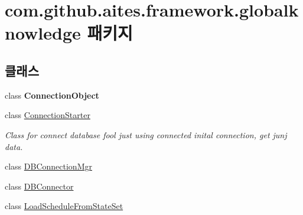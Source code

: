 \hypertarget{namespacecom_1_1github_1_1aites_1_1framework_1_1globalknowledge}{}\section{com.\+github.\+aites.\+framework.\+globalknowledge 패키지}
\label{namespacecom_1_1github_1_1aites_1_1framework_1_1globalknowledge}
\subsection*{클래스}
\begin{DoxyCompactItemize}
\item 
class {\bfseries Connection\+Object}
\item 
class \mbox{\hyperlink{classcom_1_1github_1_1aites_1_1framework_1_1globalknowledge_1_1_connection_starter}{Connection\+Starter}}
\begin{DoxyCompactList}\small\item\em Class for connect database fool just using connected inital connection, get junj data. \end{DoxyCompactList}\item 
class \mbox{\hyperlink{classcom_1_1github_1_1aites_1_1framework_1_1globalknowledge_1_1_d_b_connection_mgr}{D\+B\+Connection\+Mgr}}
\item 
class \mbox{\hyperlink{classcom_1_1github_1_1aites_1_1framework_1_1globalknowledge_1_1_d_b_connector}{D\+B\+Connector}}
\item 
class \mbox{\hyperlink{classcom_1_1github_1_1aites_1_1framework_1_1globalknowledge_1_1_load_schedule_from_state_set}{Load\+Schedule\+From\+State\+Set}}
\end{DoxyCompactItemize}
